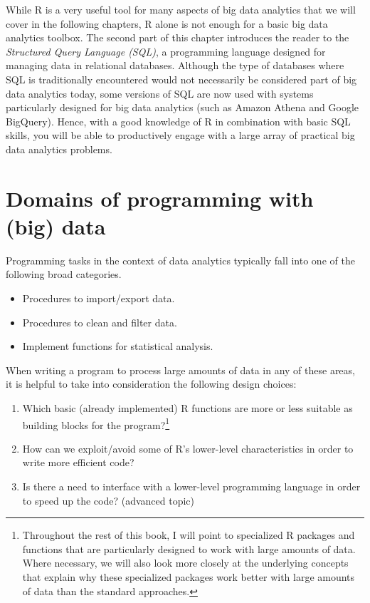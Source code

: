 \documentclass[
  12pt,
]{style/krantz}
\providecommand{\tightlist}{%
  \setlength{\itemsep}{0pt}\setlength{\parskip}{0pt}}
\begin{document}
While R is a very useful tool for many aspects of big data analytics that we will cover in the following chapters, R alone is not enough for a basic big data analytics toolbox. The second part of this chapter introduces the reader to the \emph{Structured Query Language (SQL)}, a programming language designed for managing data in relational databases. Although the type of databases where SQL is traditionally encountered would not necessarily be considered part of big data analytics today, some versions of SQL are now used with systems particularly designed for big data analytics (such as Amazon Athena and Google BigQuery). Hence, with a good knowledge of R in combination with basic SQL skills, you will be able to productively engage with a large array of practical big data analytics problems.

\hypertarget{domains-of-programming-with-big-data}{%
\section{Domains of programming with (big) data}\label{domains-of-programming-with-big-data}}

Programming tasks in the context of data analytics typically fall into one of the following broad categories.

\begin{itemize}
\tightlist
\item
  Procedures to import/export data.
\item
  Procedures to clean and filter data.
\item
  Implement functions for statistical analysis.
\end{itemize}

When writing a program to process large amounts of data in any of these areas, it is helpful to take into consideration the following design choices:

\begin{enumerate}
\def\labelenumi{\arabic{enumi}.}
\tightlist
\item
  Which basic (already implemented) R functions are more or less suitable as building blocks for the program?\footnote{Throughout the rest of this book, I will point to specialized R packages and functions that are particularly designed to work with large amounts of data. Where necessary, we will also look more closely at the underlying concepts that explain why these specialized packages work better with large amounts of data than the standard approaches.}
\item
  How can we exploit/avoid some of R's lower-level characteristics in order to write more efficient code?
\item
  Is there a need to interface with a lower-level programming language in order to speed up the code? (advanced topic)
\end{enumerate}
\end{document}
